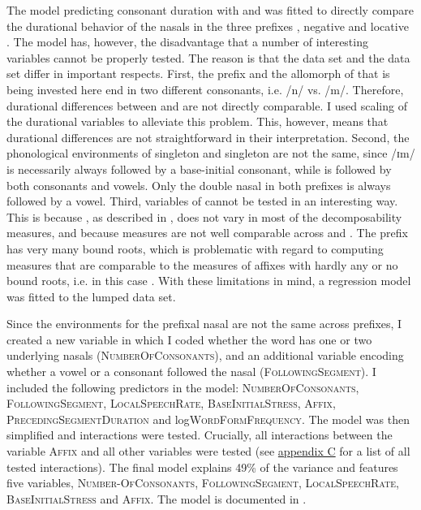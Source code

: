The model predicting consonant duration with  and  was fitted to directly compare the durational behavior of the nasals in the three prefixes , negative  and locative . The model has, however, the disadvantage that a number of interesting variables cannot be properly tested. The reason is that the  data set and the data set differ in important respects.
First, the prefix  and the allomorph of  that is being invested here end in two different consonants, i.e.  /n/ vs. /m/. Therefore, durational differences between  and  are not directly comparable. I  used scaling of the durational variables to alleviate this problem. This, however, means that durational differences are not straightforward in their interpretation. 
Second, the phonological environments of singleton  and singleton  are not the same, since /ɪm/ is necessarily always followed by a base-initial consonant, while  is followed by both consonants and vowels. Only the double nasal in both prefixes is always followed by a vowel.
Third, variables of   cannot be tested in an interesting way. This is because , as described in , does not vary in most of the decomposability measures, and because  measures are not well comparable across  and . The prefix  has very many bound roots, which is problematic with regard to computing  measures that are comparable to the  measures of affixes with hardly any or no bound roots, i.e. in this case . 
With these limitations in mind, a regression model was fitted to the lumped data set.  

Since the environments for the prefixal nasal are not the same across prefixes, I created a new variable in which I coded whether the word has one or two underlying nasals (\textsc{NumberOfConsonants}), and an additional variable encoding whether a vowel or a consonant followed the nasal (\textsc{FollowingSegment}). I included the following predictors in the model: \textsc{NumberOfConsonants}, \textsc{FollowingSegment}, \textsc{LocalSpeechRate},  \textsc{BaseInitialStress}, \textsc{Affix}, \textsc{PrecedingSegmentDuration} and log\textsc{WordFormFrequency}.
The model was then simplified and interactions were tested. Crucially, all interactions between the variable \textsc{Affix} and all other variables were tested (see \hyperref[Appendix C: Summaries of tested interactions in corpus study]{appendix C} for a list of all tested interactions). 
The final model explains 49\% of the variance and features five variables, \textsc{Number-OfConsonants}, \textsc{FollowingSegment}, \textsc{LocalSpeechRate}, \textsc{BaseInitialStress} and \textsc{Affix}. The model is documented in .




